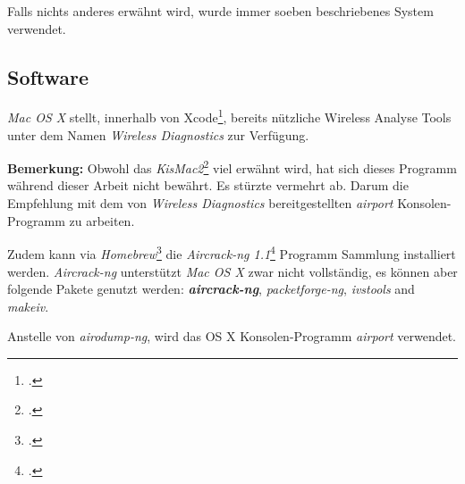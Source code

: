 Falls nichts anderes erwähnt wird, wurde immer soeben beschriebenes System verwendet.


\subsection{Software}
\textit{Mac OS X} stellt, innerhalb von Xcode\footcite{Xcode_Apple_Developer_2015-04-06}, bereits nützliche Wireless Analyse Tools unter dem Namen \textit{Wireless Diagnostics} zur Verfügung.

\begin{framed}
	\textbf{Bemerkung:} Obwohl das \textit{KisMac2}\footcite{IGR_Software_KisMac2_2015-04-06} viel erwähnt wird, hat sich dieses Programm während dieser Arbeit nicht bewährt. Es stürzte vermehrt ab. Darum die Empfehlung mit dem von \textit{Wireless Diagnostics} bereitgestellten \textit{airport} Konsolen-Programm zu arbeiten.
\end{framed}

Zudem kann via \textit{Homebrew}\footcite{Homebrew__The_missing_package_manager_for_OS_X_2015-04-06} die \textit{Aircrack-ng 1.1}\footcite{Aircrack-ng_2015-04-06} Programm Sammlung installiert werden.
\textit{\textit{Aircrack-ng}} unterstützt \textit{Mac OS X} zwar nicht vollständig, es können aber folgende Pakete genutzt werden: \textbf{\textit{aircrack-ng}}, \textit{packetforge-ng}, \textit{ivstools} and \textit{makeiv}.

Anstelle von \textit{airodump-ng}, wird das OS X Konsolen-Programm \textit{airport} verwendet.
